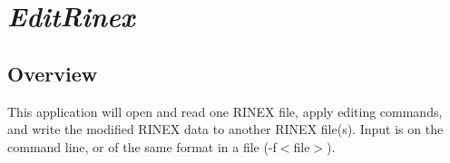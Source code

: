 %
%

\section{\emph{EditRinex}}
\subsection{Overview}
This application will open and read one RINEX file, apply editing commands,
 and write the modified RINEX data to another RINEX file(s).
 Input is on the command line, or of the same format in a file (-f$<$file$>$).

